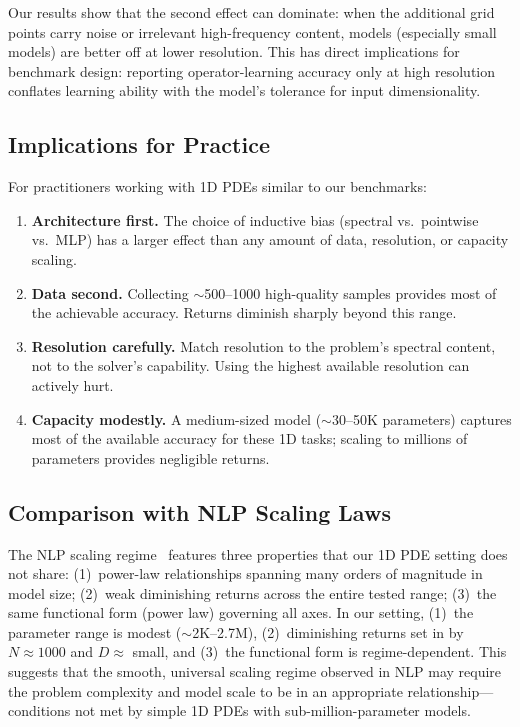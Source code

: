 \documentclass[11pt]{article}
\begin{document}
Our results show that the second effect can dominate: when the
additional grid points carry noise or irrelevant high-frequency
content, models (especially small models) are better off at lower
resolution.
This has direct implications for benchmark design: reporting
operator-learning accuracy only at high resolution conflates learning
ability with the model's tolerance for input dimensionality.

\subsection{Implications for Practice}

For practitioners working with 1D PDEs similar to our benchmarks:
\begin{enumerate}[leftmargin=*,itemsep=2pt]
  \item \textbf{Architecture first.} The choice of inductive bias
    (spectral vs.\ pointwise vs.\ MLP) has a larger effect than any
    amount of data, resolution, or capacity scaling.
  \item \textbf{Data second.} Collecting $\sim$500--1000 high-quality
    samples provides most of the achievable accuracy. Returns diminish
    sharply beyond this range.
  \item \textbf{Resolution carefully.} Match resolution to the problem's
    spectral content, not to the solver's capability. Using the
    highest available resolution can actively hurt.
  \item \textbf{Capacity modestly.} A medium-sized model ($\sim$30--50K
    parameters) captures most of the available accuracy for these 1D
    tasks; scaling to millions of parameters provides negligible
    returns.
\end{enumerate}

\subsection{Comparison with NLP Scaling Laws}
\label{sec:nlp-comparison}

The NLP scaling regime~\citep{kaplan2020scaling,hoffmann2022training}
features three properties that our 1D PDE setting does not share:
(1)~power-law relationships spanning many orders of magnitude in
model size; (2)~weak diminishing returns across the entire tested
range; (3)~the same functional form (power law) governing all axes.
In our setting, (1)~the parameter range is modest
($\sim$2K--2.7M), (2)~diminishing returns set in by $N \approx 1000$
and $D \approx$ small, and (3)~the functional form is
regime-dependent. This suggests that the smooth, universal scaling
regime observed in NLP may require the problem complexity and model
scale to be in an appropriate relationship---conditions not met by
simple 1D PDEs with sub-million-parameter models.
\end{document}
